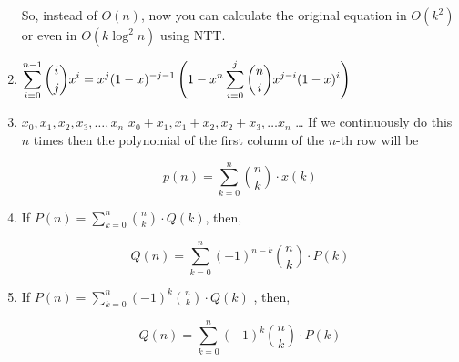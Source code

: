 \begin{enumerate}
                So, instead of $O(n)$, now you can calculate the original equation in $O(k^2)$ or even in $O(k \log^2
                    n)$
                    using NTT.

            
            \item $\displaystyle \displaystyle \sum \limits_{i=0}^{n-1} {i \choose j} x^i = x^j(1-x)^{-j-1}\left( 1- x^n
                \sum
                \limits_{i=0}^j {n \choose i} x^{j-i} (1-x)^i \right)$
            \item 
                $\displaystyle x_{0}, x_{1}, x_{2}, x_{3}, … , x_{n}$
                    $\displaystyle x_{0} + x_{1}, x_{1} + x_{2}, x_{2}+x_{3}, … x_{n}$
                    …
                    If we continuously do this $n$ times then the polynomial of the first column of the $n$-th row will
                    be
                

                \[\displaystyle p(n)=\sum_{k=0}^{n}{n \choose k} \cdot x(k)\]
            
            \item 
                If $\displaystyle P(n)=\sum_{k=0}^{n}{n \choose k} \cdot Q(k)$,
                    then,

                \[Q(n)=\sum_{k=0}^{n}(-1)^{n-k}{n \choose k} \cdot P(k)\]
            
            \item 
                If $\displaystyle P(n)=\sum_{k=0}^{n}(-1)^{k}{n \choose k} \cdot Q(k)$ ,
                    then,

                \[Q(n)=\sum_{k=0}^{n}(-1)^{k}{n \choose k} \cdot P(k)\]
                \end{enumerate}
